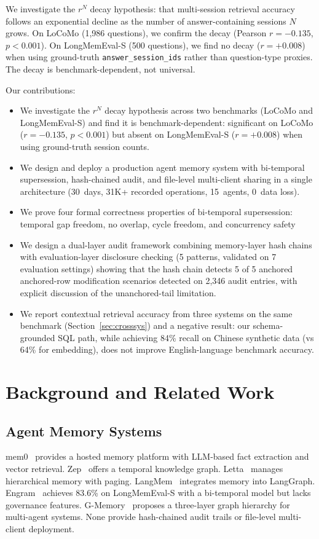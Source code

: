 \documentclass{article}
\begin{document}
We investigate the $r^N$ decay hypothesis: that multi-session retrieval accuracy follows an exponential decline as the number of answer-containing sessions $N$ grows. On LoCoMo (1{,}986 questions), we confirm the decay (Pearson $r = -0.135$, $p < 0.001$). On LongMemEval-S (500 questions), we find no decay ($r = +0.008$) when using ground-truth \texttt{answer\_session\_ids} rather than question-type proxies. The decay is benchmark-dependent, not universal.

Our contributions:
\begin{itemize}
\item We investigate the $r^N$ decay hypothesis across two benchmarks (LoCoMo and LongMemEval-S) and find it is benchmark-dependent: significant on LoCoMo ($r = -0.135$, $p < 0.001$) but absent on LongMemEval-S ($r = +0.008$) when using ground-truth session counts.
\item We design and deploy a production agent memory system with bi-temporal supersession, hash-chained audit, and file-level multi-client sharing in a single architecture (30~days, 31K+ recorded operations, 15~agents, 0~data loss).
\item We prove four formal correctness properties of bi-temporal supersession: temporal gap freedom, no overlap, cycle freedom, and concurrency safety
\item We design a dual-layer audit framework combining memory-layer hash chains with evaluation-layer disclosure checking (5 patterns, validated on 7 evaluation settings) showing that the hash chain detects 5 of 5 anchored anchored-row modification scenarios detected on 2{,}346 audit entries, with explicit discussion of the unanchored-tail limitation.
\item We report contextual retrieval accuracy from three systems on the same benchmark (Section~\ref{sec:crosssys}) and a negative result: our schema-grounded SQL path, while achieving 84\% recall on Chinese synthetic data (vs 64\% for embedding), does not improve English-language benchmark accuracy.
\end{itemize}

\section{Background and Related Work}
\label{sec:related}

\subsection{Agent Memory Systems}
mem0~\citep{mem0} provides a hosted memory platform with LLM-based fact extraction and vector retrieval. Zep~\citep{zep} offers a temporal knowledge graph. Letta~\citep{letta} manages hierarchical memory with paging. LangMem~\citep{langmem} integrates memory into LangGraph. Engram~\citep{engram} achieves 83.6\% on LongMemEval-S with a bi-temporal model but lacks governance features. G-Memory~\citep{gmotion} proposes a three-layer graph hierarchy for multi-agent systems. None provide hash-chained audit trails or file-level multi-client deployment.
\end{document}
